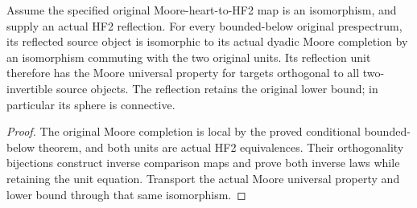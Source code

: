 \begin{proposition}
  \label{prop:actual-bounded-below-reflection-moore-comparison}
  \leanok
  Assume the specified original Moore-heart-to-HF2 map is an isomorphism, and supply an actual HF2 reflection. For every bounded-below original prespectrum, its reflected source object is isomorphic to its actual dyadic Moore completion by an isomorphism commuting with the two original units. Its reflection unit therefore has the Moore universal property for targets orthogonal to all two-invertible source objects. The reflection retains the original lower bound; in particular its sphere is connective.
\end{proposition}
\begin{proof}
  The original Moore completion is local by the proved conditional bounded-below theorem, and both units are actual HF2 equivalences. Their orthogonality bijections construct inverse comparison maps and prove both inverse laws while retaining the unit equation. Transport the actual Moore universal property and lower bound through that same isomorphism.
  \leanok
\end{proof}

